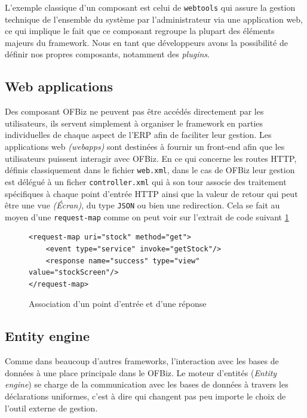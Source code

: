 L'exemple classique d'un composant est celui de \verb|webtools| qui assure la gestion technique de l'ensemble du système par l'administrateur via une application web, ce qui implique le fait que ce composant regroupe la plupart des éléments majeurs du framework.
Nous en tant que développeurs avons la possibilité de définir nos propres composants, notamment des \emph{plugins}. 
  


\subsection{Web applications}
Des composant OFBiz ne peuvent pas être accédés directement par les utilisateurs, ils servent simplement à organiser le framework en parties individuelles de chaque aspect de l'ERP afin de faciliter leur gestion. Les applications web \emph{(webapps)} sont destinées à fournir un front-end afin que les utilisateurs puissent interagir avec OFBiz. En ce qui concerne les routes HTTP, définis classiquement dans le fichier \verb|web.xml|, dans le cas de OFBiz leur gestion est délégué à un ficher \verb|controller.xml| qui à son tour associe des traitement spécifiques à chaque point d'entrée HTTP ainsi que la valeur de retour qui peut être une vue \emph{(Écran)}, du type \verb|JSON| ou bien une redirection. Cela se fait au moyen d'une \verb|request-map| comme on peut voir sur l'extrait de code suivant \ref{reqmap}



\lstset{language=XML}
\begin{figure}
\begin{lstlisting}
<request-map uri="stock" method="get">
    <event type="service" invoke="getStock"/>
    <response name="success" type="view" value="stockScreen"/>
</request-map>
\end{lstlisting}
	\caption{Association d'un point d'entrée et d'une réponse}
\label{reqmap}
\end{figure}



\subsection{Entity engine}
Comme dans beaucoup d'autres frameworks, l'interaction avec les bases de données à une place principale dans le OFBiz. Le moteur d'entités (\emph{Entity engine}) se charge de la communication avec les  bases de données à travers les déclarations uniformes, c'est à dire qui changent pas peu importe le choix de l'outil externe de gestion.



